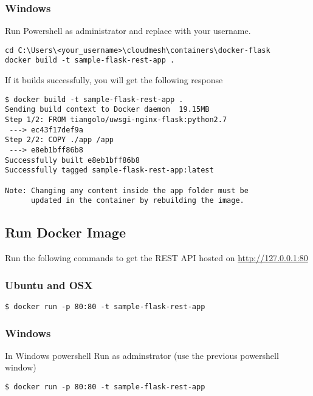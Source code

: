 \subsubsection{Windows}

Run Powershell as administrator and replace with your username.

\begin{lstlisting}
cd C:\Users\<your_username>\cloudmesh\containers\docker-flask
docker build -t sample-flask-rest-app .
\end{lstlisting}

If it builds successfully, you will get the following response

\begin{lstlisting}
$ docker build -t sample-flask-rest-app .
Sending build context to Docker daemon  19.15MB
Step 1/2: FROM tiangolo/uwsgi-nginx-flask:python2.7
 ---> ec43f17def9a
Step 2/2: COPY ./app /app
 ---> e8eb1bff86b8
Successfully built e8eb1bff86b8
Successfully tagged sample-flask-rest-app:latest

Note: Changing any content inside the app folder must be
      updated in the container by rebuilding the image.
\end{lstlisting}

\subsection{Run Docker Image}

Run the following commands to get the REST API hosted on
\url{http://127.0.0.1:80}

\subsubsection{Ubuntu and OSX}

\begin{lstlisting}
$ docker run -p 80:80 -t sample-flask-rest-app
\end{lstlisting}

\subsubsection{Windows}

In Windows powershell Run as adminstrator (use the previous powershell
window)

\begin{lstlisting}
$ docker run -p 80:80 -t sample-flask-rest-app
\end{lstlisting}

